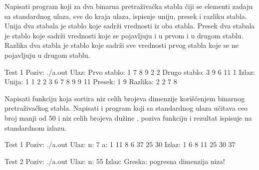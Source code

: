 \begin{Answer}[ref=707]
\end{Answer}


\begin{Exercise}[label=708, difficulty=1]
Napisati program koji za dva binarna pretraživačka stabla čiji se elementi zadaju sa standardnog ulaza, sve do kraja ulaza, ispisuje uniju, presek i razliku stabla. Unija dva stabala je stablo koje sadrži vrednosti iz oba stabla. Presek dva stabala je stablo koje sadrži vrednosti koje se pojavljuju i u prvom i u drugom stablu. Razlika dva stabla je stablo koje sadrži sve vrednosti prvog stabla koje se ne pojavljuju u drugom stablu. 

\begin{miditest}
\begin{test}{Test 1}
Poziv: ./a.out
Ulaz:
	Prvo stablo: 1 7 8 9 2 2
	Drugo stablo: 3 9 6 11 1
Izlaz:
	Unija:  1 1 2 2 3 6 7 8 9 9 11
	Presek: 1 9 
	Razlika: 2 2 7 8 
\end{test}
\end{miditest}


\end{Exercise}

\begin{Answer}[ref=708]
\end{Answer}


\begin{Exercise}[label=709]
Napisati funkciju  koja sortira niz celih brojeva  dimenzije  korišćenjem binarnog pretraživačkog stabla. Napisati i program koji sa standardnog ulaza učitava ceo broj  manji od 50 i niz  celih brojeva dužine , poziva funkciju  i rezultat ispisuje na standardnom izlazu.  

\begin{miditest}
\begin{test}{Test 1}
Poziv: ./a.out
Ulaz:
	n: 7 
	a: 1 11 8 6 37 25 30
Izlaz:
	1 6 8 11 25 30 37 
\end{test}
\end{miditest}

\begin{maxitest}
\begin{test}{Test 2}
Poziv: ./a.out
Ulaz:
	n: 55 
Izlaz:
	Greska: pogresna dimenzija niza!
\end{test}
\end{maxitest}


\end{Exercise}

